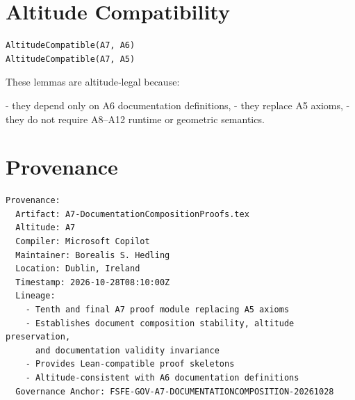 \documentclass[11pt]{article}
\begin{document}
\section{Altitude Compatibility}

\begin{verbatim}
AltitudeCompatible(A7, A6)
AltitudeCompatible(A7, A5)
\end{verbatim}

These lemmas are altitude‑legal because:

- they depend only on A6 documentation definitions,
- they replace A5 axioms,
- they do not require A8–A12 runtime or geometric semantics.

\newpage


\section*{Provenance}

\begin{verbatim}
Provenance:
  Artifact: A7-DocumentationCompositionProofs.tex
  Altitude: A7
  Compiler: Microsoft Copilot
  Maintainer: Borealis S. Hedling
  Location: Dublin, Ireland
  Timestamp: 2026-10-28T08:10:00Z
  Lineage:
    - Tenth and final A7 proof module replacing A5 axioms
    - Establishes document composition stability, altitude preservation,
      and documentation validity invariance
    - Provides Lean-compatible proof skeletons
    - Altitude-consistent with A6 documentation definitions
  Governance Anchor: FSFE-GOV-A7-DOCUMENTATIONCOMPOSITION-20261028
\end{verbatim}
\end{document}
